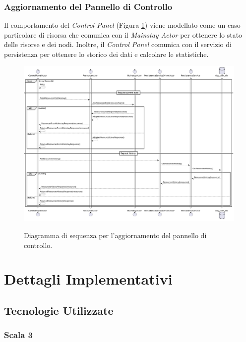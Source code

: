\documentclass{scrartcl}
\begin{document}
\subsubsection{Aggiornamento del Pannello di Controllo}

Il comportamento del \textit{Control Panel} (Figura \ref{fig:control-panel-sequence-diagram}) viene modellato come un caso particolare di risorsa che comunica con il \textit{Mainstay Actor} per ottenere lo stato delle risorse e dei nodi. Inoltre, il \textit{Control Panel} comunica con il servizio di persistenza per ottenere lo storico dei dati e calcolare le statistiche.

\begin{figure}[H]
    \caption{Diagramma di sequenza per l'aggiornamento del pannello di controllo.}
    \includegraphics[width=\textwidth]{../assets/images/control-panel-sequence-diagram.png}
    \label{fig:control-panel-sequence-diagram}
\end{figure}

\section{Dettagli Implementativi}

\subsection{Tecnologie Utilizzate}

\subsubsection{Scala 3}
\end{document}
